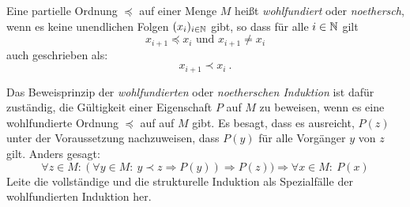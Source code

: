\begin{aufgabe}
Eine partielle Ordnung $\preccurlyeq$ auf einer Menge $M$ heißt
\textit{wohlfundiert} oder \textit{noethersch}, wenn es keine
unendlichen Folgen $(x_i)_{i\in \mathbb{N}}$ gibt, so dass für alle $i\in\mathbb{N}$ gilt
%
\begin{displaymath}
  x_{i+1} \preccurlyeq x_{i} \text{ und } x_{i+1} \neq x_{i}
\end{displaymath}
%
auch geschrieben als:
%
\begin{displaymath}
  x_{i+1} \prec x_{i}\ .
\end{displaymath}
%

Das Beweisprinzip der \textit{wohlfundierten} oder \textit{noetherschen Induktion} ist dafür zuständig, die
Gültigkeit einer Eigenschaft $P$ auf $M$ zu beweisen, wenn es eine
wohlfundierte Ordnung $\preccurlyeq$ auf auf $M$ gibt.  Es besagt, dass
es ausreicht, $P(z)$ unter der Voraussetzung nachzuweisen, dass $P(y)$
für alle Vorgänger $y$ von $z$ gilt.  Anders gesagt:
%
\begin{displaymath}
  \forall z\in M:(\forall y\in M:~ y\prec z \Rightarrow P(y)) \Rightarrow P(z))
  \Rightarrow \forall x \in M:~P(x)
\end{displaymath}
%
Leite die vollständige und die strukturelle Induktion als Spezialfälle
der wohlfundierten Induktion her.
\end{aufgabe}


